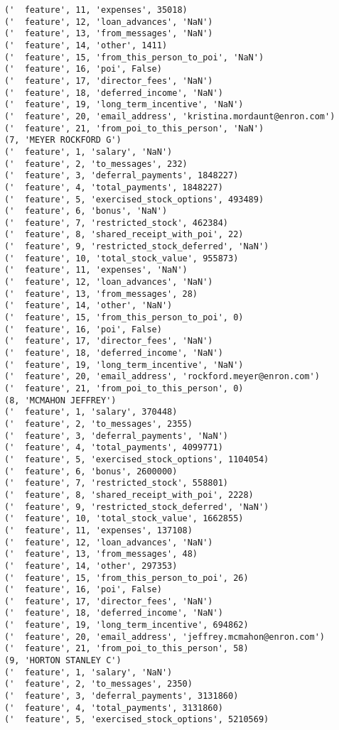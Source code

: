 \begin{verbatim}
('  feature', 11, 'expenses', 35018)
('  feature', 12, 'loan_advances', 'NaN')
('  feature', 13, 'from_messages', 'NaN')
('  feature', 14, 'other', 1411)
('  feature', 15, 'from_this_person_to_poi', 'NaN')
('  feature', 16, 'poi', False)
('  feature', 17, 'director_fees', 'NaN')
('  feature', 18, 'deferred_income', 'NaN')
('  feature', 19, 'long_term_incentive', 'NaN')
('  feature', 20, 'email_address', 'kristina.mordaunt@enron.com')
('  feature', 21, 'from_poi_to_this_person', 'NaN')
(7, 'MEYER ROCKFORD G')
('  feature', 1, 'salary', 'NaN')
('  feature', 2, 'to_messages', 232)
('  feature', 3, 'deferral_payments', 1848227)
('  feature', 4, 'total_payments', 1848227)
('  feature', 5, 'exercised_stock_options', 493489)
('  feature', 6, 'bonus', 'NaN')
('  feature', 7, 'restricted_stock', 462384)
('  feature', 8, 'shared_receipt_with_poi', 22)
('  feature', 9, 'restricted_stock_deferred', 'NaN')
('  feature', 10, 'total_stock_value', 955873)
('  feature', 11, 'expenses', 'NaN')
('  feature', 12, 'loan_advances', 'NaN')
('  feature', 13, 'from_messages', 28)
('  feature', 14, 'other', 'NaN')
('  feature', 15, 'from_this_person_to_poi', 0)
('  feature', 16, 'poi', False)
('  feature', 17, 'director_fees', 'NaN')
('  feature', 18, 'deferred_income', 'NaN')
('  feature', 19, 'long_term_incentive', 'NaN')
('  feature', 20, 'email_address', 'rockford.meyer@enron.com')
('  feature', 21, 'from_poi_to_this_person', 0)
(8, 'MCMAHON JEFFREY')
('  feature', 1, 'salary', 370448)
('  feature', 2, 'to_messages', 2355)
('  feature', 3, 'deferral_payments', 'NaN')
('  feature', 4, 'total_payments', 4099771)
('  feature', 5, 'exercised_stock_options', 1104054)
('  feature', 6, 'bonus', 2600000)
('  feature', 7, 'restricted_stock', 558801)
('  feature', 8, 'shared_receipt_with_poi', 2228)
('  feature', 9, 'restricted_stock_deferred', 'NaN')
('  feature', 10, 'total_stock_value', 1662855)
('  feature', 11, 'expenses', 137108)
('  feature', 12, 'loan_advances', 'NaN')
('  feature', 13, 'from_messages', 48)
('  feature', 14, 'other', 297353)
('  feature', 15, 'from_this_person_to_poi', 26)
('  feature', 16, 'poi', False)
('  feature', 17, 'director_fees', 'NaN')
('  feature', 18, 'deferred_income', 'NaN')
('  feature', 19, 'long_term_incentive', 694862)
('  feature', 20, 'email_address', 'jeffrey.mcmahon@enron.com')
('  feature', 21, 'from_poi_to_this_person', 58)
(9, 'HORTON STANLEY C')
('  feature', 1, 'salary', 'NaN')
('  feature', 2, 'to_messages', 2350)
('  feature', 3, 'deferral_payments', 3131860)
('  feature', 4, 'total_payments', 3131860)
('  feature', 5, 'exercised_stock_options', 5210569)

\end{verbatim}

